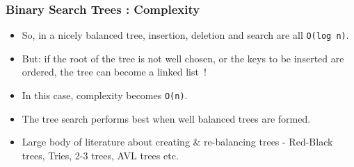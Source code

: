 
\begin{frame}[fragile]
\frametitle{Binary Search Trees : Complexity}

\begin{itemize}[<+->]
\item So, in a nicely balanced tree, insertion, deletion and search are all \verb^O(log n)^.
\item  But: if the root of the tree is not well chosen, or the keys to be inserted are ordered, the tree can become a linked list~!
\item In this case,  complexity becomes \verb^O(n)^.	
\item The tree search performs best when well balanced trees are formed.
\item Large body of literature about creating \& re-balancing trees - Red-Black trees, Tries, 2-3 trees, AVL trees etc.
\end{itemize}

\end{frame}
